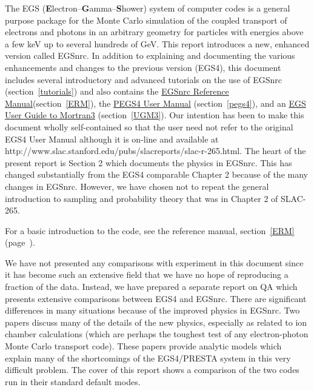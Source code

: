 The EGS ({\bfseries E}lectron--{\bfseries G}amma--{\bfseries S}hower) system of computer codes is a general purpose package
for the Monte Carlo simulation of the coupled transport of electrons and
photons in an arbitrary geometry for particles with energies above a few
keV up to several hundreds of GeV.  This report introduces a new, enhanced version
called EGSnrc. In addition to explaining and documenting the various
enhancements and changes to the previous version (EGS4\cite{Ne85}),
this document includes several introductory and advanced tutorials
on the use of EGSnrc (section~\ref{tutorials}) and also contains
the \underline{EGSnrc Reference Manual}(section~\ref{ERM}),
the \underline{PEGS4 User Manual} (section~\ref{pegs4}), and
an \underline{EGS User Guide to Mortran3} (section~\ref{UGM3}).
Our intention has been to make this document wholly self-contained so
that the user need not refer to the original EGS4 User Manual\cite{Ne85}
although it is on-line and available at 
{http://www.slac.stanford.edu/pubs/slacreports/slac-r-265.html}.
The heart of the present report is Section 2 which documents the physics
in EGSnrc. This has changed substantially from the EGS4 comparable Chapter
2 because of the many changes in EGSnrc. However, we have chosen not to
repeat the general introduction to sampling and probability theory that
was in Chapter 2 of SLAC-265.

For a basic introduction to the code, see the reference manual,
section~\ref{ERM} (page~\pageref{ERM}).

We have not presented any comparisons with experiment in this
document since it has become such an extensive field that we have no
hope of reproducing a fraction of the data. Instead, we have prepared
a separate report on QA which presents extensive comparisons between
EGS4 and EGSnrc\cite{Wa00}. There are
significant differences in many situations because of the improved physics
in EGSnrc.  Two papers\cite{Ka99a,Ka99b} discuss many
of the details of the new physics, especially as related to ion chamber
calculations (which are perhaps the toughest test of any electron-photon
Monte Carlo transport code).  These papers provide analytic models which
explain many of the shortcomings of the EGS4/PRESTA system in this very
difficult problem.  The cover of this report shows a 
comparison of the two codes run in their standard default modes.


